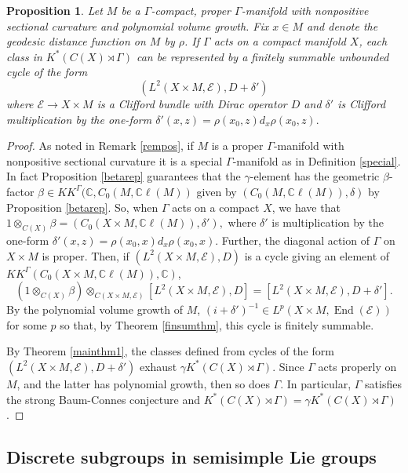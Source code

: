 \documentclass[a4paper,reqno]{amsart}
\numberwithin{equation}{section}
\def\End{\operatorname{End}}
\def\C{\mathbb{C}}
\newtheorem{prop}[thm]{Proposition}
\theoremstyle{definition}
\theoremstyle{remark}
\begin{document}
\begin{prop}
Let $M$ be a $\Gamma$-compact, proper $\Gamma$-manifold with nonpositive sectional curvature and polynomial volume growth. Fix $x \in M$ and denote the geodesic distance function on $M$ by $\rho$. If $\Gamma$ acts on a compact manifold $X$, each class in $K^*(C(X) \rtimes \Gamma)$ can be represented by a finitely summable unbounded cycle of the form 
\[(L^2(X \times M, \mathcal{E}), D + \delta')\] 
where $\mathcal{E}\to X \times M$ is a Clifford bundle with Dirac operator $D$ and $\delta'$ is Clifford multiplication by the one-form $\delta'(x,z) = \rho(x_0,z)d_x \rho(x_0,z).$
\end{prop}

\begin{proof}
As noted in Remark \ref{rempos}, if $M$ is a proper $\Gamma$-manifold with nonpositive sectional curvature it is a special $\Gamma$-manifold as in Definition \ref{special}. In fact Proposition \ref{betarep} guarantees that the $\gamma$-element has the geometric $\beta$-factor $\beta \in KK^\Gamma(\C, C_0(M, \C\ell(M))$  given by $(C_0(M, \C\ell(M)),\delta)$ by Proposition \ref{betarep}. So, when $\Gamma$ acts on a compact $X$, we have that $1 \otimes_{C(X)} \beta = (C_0(X \times M, \C \ell(M)), \delta'),$ where $\delta'$ is multiplication by the one-form $\delta'(x,z) = \rho(x_0,x)d_x \rho(x_0,x).$ Further, the diagonal action of $\Gamma$ on $X \times M$ is proper. Then, if $(L^2(X \times M,\mathcal{E}), D)$ is a cycle giving an element of $KK^\Gamma(C_0(X \times M, \C \ell(M)),\C)$, 
\[(1\otimes_{C(X)} \beta) \otimes_{C(X\times M,\mathcal{E})} [L^2(X \times M,\mathcal{E}), D] = [L^2(X \times M, \mathcal{E}), D + \delta'] .\] 
 By the polynomial volume growth of $M$, $(i+\delta')^{-1} \in L^p(X \times M, \End(\mathcal{E}))$ for some $p$ so that, by Theorem \ref{finsumthm}, this cycle is finitely summable. 
 
By Theorem \ref{mainthm1}, the classes defined from cycles of the form $(L^2(X \times M, \mathcal{E}), D + \delta')$ exhaust  $\gamma K^*(C(X) \rtimes \Gamma)$. Since $\Gamma$ acts properly on $M$, and the latter has polynomial growth, then so does $\Gamma$. In particular, $\Gamma$ satisfies the strong Baum-Connes conjecture and $K^*(C(X) \rtimes \Gamma)=\gamma K^*(C(X) \rtimes \Gamma)$. 
\end{proof} 






\subsection{Discrete subgroups in semisimple Lie groups}
\end{document}

